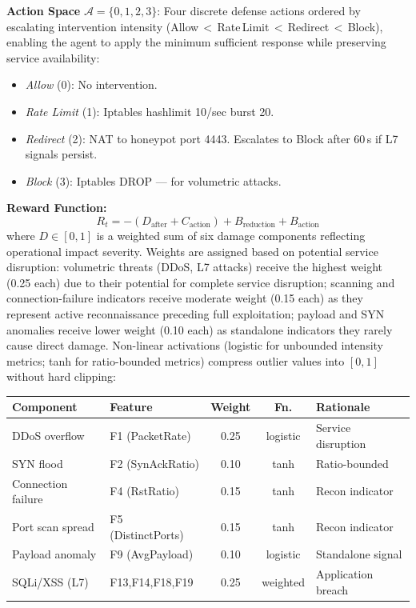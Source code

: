 \documentclass[conference]{IEEEtran}
\begin{document}
\textbf{Action Space} $\mathcal{A} = \{0,1,2,3\}$: Four discrete defense
actions ordered by escalating intervention intensity
(Allow\,$<$\,Rate\,Limit\,$<$\,Redirect\,$<$\,Block), enabling the agent
to apply the minimum sufficient response while preserving service
availability:
\begin{itemize}
  \item \textit{Allow} (0): No intervention.
  \item \textit{Rate Limit} (1): Iptables hashlimit 10/sec burst 20.
  \item \textit{Redirect} (2): NAT to honeypot port 4443. Escalates to
    Block after 60\,s if L7 signals persist.
  \item \textit{Block} (3): Iptables DROP --- for volumetric attacks.
\end{itemize}

\textbf{Reward Function:}
\begin{equation}
  R_t = -\!\left(D_{\text{after}} + C_{\text{action}}\right)
        + B_{\text{reduction}} + B_{\text{action}}
  \label{eq:reward}
\end{equation}
where $D \in [0,1]$ is a weighted sum of six damage components reflecting
operational impact severity.
Weights are assigned based on potential service disruption: volumetric threats (DDoS, L7 attacks)
receive the highest weight (0.25 each) due to their potential for complete
service disruption; scanning and connection-failure indicators receive
moderate weight (0.15 each) as they represent active reconnaissance
preceding full exploitation; payload and SYN anomalies receive lower
weight (0.10 each) as standalone indicators they rarely cause direct damage.
Non-linear activations (logistic for unbounded intensity metrics;
tanh for ratio-bounded metrics) compress outlier values into $[0,1]$
without hard clipping:

\begin{center}\scriptsize
\setlength{\tabcolsep}{3pt}
\begin{tabular}{llccl}
\toprule
\textbf{Component} & \textbf{Feature} & \textbf{Weight} & \textbf{Fn.} & \textbf{Rationale} \\
\midrule
DDoS overflow      & F1 (PacketRate)    & 0.25 & logistic & Service disruption \\
SYN flood          & F2 (SynAckRatio)   & 0.10 & tanh     & Ratio-bounded \\
Connection failure & F4 (RstRatio)      & 0.15 & tanh     & Recon indicator \\
Port scan spread   & F5 (DistinctPorts) & 0.15 & tanh     & Recon indicator \\
Payload anomaly    & F9 (AvgPayload)    & 0.10 & logistic & Standalone signal \\
SQLi/XSS (L7)      & F13,F14,F18,F19   & 0.25 & weighted & Application breach \\
\bottomrule
\end{tabular}
\end{center}
\end{document}
